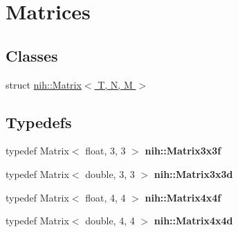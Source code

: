 \hypertarget{group__matrices}{
\section{\-Matrices}
\label{group__matrices}
}
\subsection*{\-Classes}
\begin{DoxyCompactItemize}
\item 
struct \hyperlink{structnih_1_1_matrix}{nih\-::\-Matrix$<$ T, N, M $>$}
\end{DoxyCompactItemize}
\subsection*{\-Typedefs}
\begin{DoxyCompactItemize}
\item 
\hypertarget{group__matrices_ga068289888360ffe2e4c54644a89c3bde}{
typedef \-Matrix$<$ float, 3, 3 $>$ {\bfseries nih\-::\-Matrix3x3f}}
\label{group__matrices_ga068289888360ffe2e4c54644a89c3bde}

\item 
\hypertarget{group__matrices_gaa34814c8fbeebc00b3aacbbb9a802a0f}{
typedef \-Matrix$<$ double, 3, 3 $>$ {\bfseries nih\-::\-Matrix3x3d}}
\label{group__matrices_gaa34814c8fbeebc00b3aacbbb9a802a0f}

\item 
\hypertarget{group__matrices_gab91e326c8a8aefd74552fcf7453d9edf}{
typedef \-Matrix$<$ float, 4, 4 $>$ {\bfseries nih\-::\-Matrix4x4f}}
\label{group__matrices_gab91e326c8a8aefd74552fcf7453d9edf}

\item 
\hypertarget{group__matrices_gae98749c4d28911f80b68e56efb46b7c8}{
typedef \-Matrix$<$ double, 4, 4 $>$ {\bfseries nih\-::\-Matrix4x4d}}
\label{group__matrices_gae98749c4d28911f80b68e56efb46b7c8}

\end{DoxyCompactItemize}
